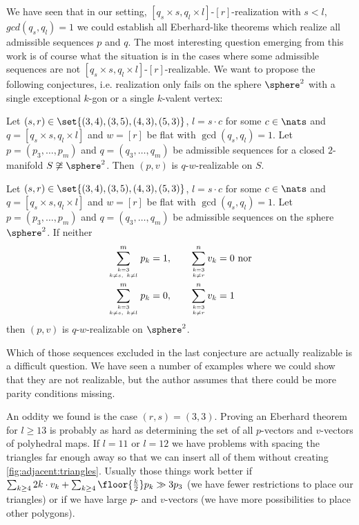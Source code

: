 \label{sec:closing:remarks}

We have seen that in our setting, $[q_s \times s, q_l \times l]$-$[r]$-realization with $s < l$, $gcd(q_s, q_l) = 1$ we could establish all {\sc Eberhard}-like theorems which realize all admissible sequences $p$ and $q$. The most interesting question emerging from this work is of course what the situation is in the cases where some admissible sequences are not $[q_s \times s, q_l \times l]$-$[r]$-realizable. 
\clearpage
We want to propose the following conjectures, i.e. realization only fails on the sphere $\sphere^2$ with a single exceptional $k$-gon or a single $k$-valent vertex:

\begin{conjecture}
  Let $(s, r) \in \set{(3, 4), (3, 5), (4, 3), (5, 3)}$, $l = s \cdot c$ for some $c \in \nats$ and $q = [q_s \times s, q_l \times l]$ and $w = [r]$ be flat with $\gcd(q_s, q_l) = 1$. Let $p = (p_3, \dots, p_m)$ and $q = (q_3, \dots, q_m)$ be admissible sequences for a closed $2$-manifold $S \not\cong \sphere^2$. Then $(p, v)$ is $q$-$w$-realizable on $S$.
\end{conjecture}

\begin{conjecture}
  Let $(s, r) \in \set{(3, 4), (3, 5), (4, 3), (5, 3)}$, $l = s \cdot c$ for some $c \in \nats$ and $q = [q_s \times s, q_l \times l]$ and $w = [r]$ be flat with $\gcd(q_s, q_l) = 1$. Let $p = (p_3, \dots, p_m)$ and $q = (q_3, \dots, q_m)$ be admissible sequences on the sphere $\sphere^2$. If neither
  \begin{align*}
    \sum_{k = 3 \atop k \neq s, ~k \neq l}^m p_k = 1, \qquad&\sum_{k = 3 \atop k \neq r}^n v_k = 0 \text{~nor} \\
    \sum_{k = 3 \atop k \neq s, ~k \neq l}^m p_k = 0, \qquad&\sum_{k = 3 \atop k \neq r}^n v_k = 1
  \end{align*}
then $(p, v)$ is $q$-$w$-realizable on $\sphere^2$.
\end{conjecture}

Which of those sequences excluded in the last conjecture are actually realizable is a difficult question. We have seen a number of examples where we could show that they are not realizable, but the author assumes that there could be more parity conditions missing.

An oddity we found is the case $(r, s) = (3, 3)$. Proving an {\sc Eberhard} theorem for $l \geq 13$ is probably as hard as determining the set of all $p$-vectors and $v$-vectors of polyhedral maps. If $l = 11$ or $l = 12$ we have problems with spacing the triangles far enough away so that we can insert all of them without creating \autoref{fig:adjacent:triangles}. Usually those things work better if $\sum_{k \geq 4} 2k \cdot v_k + \sum_{k \geq 4} \floor{\tfrac{k}{2}} p_k \gg 3p_3$ (we have fewer restrictions to place our triangles) or if we have large $p$- and $v$-vectors (we have more possibilities to place other polygons).

